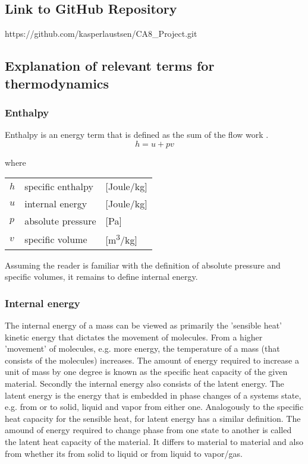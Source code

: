 \subsection{Link to GitHub Repository}
https://github.com/kasperlaustsen/CA8\_Project.git

\subsection{Explanation of relevant terms for thermodynamics}
\subsubsection{Enthalpy}
Enthalpy is an energy term that is defined as the sum of the flow work \cite{Koelet1992}.
\begin{equation}
	h = u + pv
\end{equation}

where
	\begin{center}
		\begin{tabular}{l p{3cm} l}

			$h$ & specific enthalpy & [\si{Joule}/\si{kg}]\\
			$u$ & internal energy & [\si{Joule}/\si{kg}]\\
			$p$ & absolute pressure & [\si{Pa}]\\
			$v$ & specific volume & [\si{m^3}/\si{kg}]
		\end{tabular}
	\end{center}

Assuming the reader is familiar with the definition of absolute pressure and specific volumes, it remains to define internal energy.

\subsubsection{Internal energy}
The internal energy of a mass can be viewed as primarily the 'sensible heat' kinetic energy that dictates the movement of molecules. From a higher 'movement' of molecules, e.g. more energy, the temperature of a mass (that consists of the molecules) increases. The amount of energy required to increase a unit of mass by one degree is known as the specific heat capacity of the given material.
Secondly the internal energy also consists of the latent energy. The latent energy is the energy that is embedded in phase changes of a systems state, e.g. from or to solid, liquid and vapor from either one. Analogously to the specific heat capacity for the sensible heat, for latent energy has a similar definition. The amound of energy required to change phase from one state to another is called the latent heat capacity of the material. It differs to material to material and also from whether its from solid to liquid or from liquid to vapor/gas.

